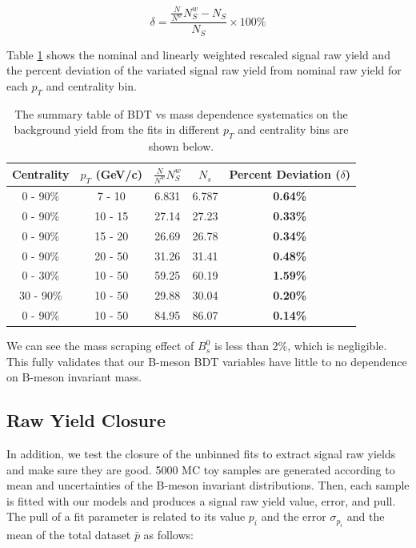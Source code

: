 \begin{equation}
\delta = \frac{\frac{N}{N^{w}} N^{w}_S - N_S}{N_S} \times 100\%
\end{equation}

Table \ref{MassScrapCheck} shows the nominal and linearly weighted rescaled signal raw yield and the percent deviation of the variated signal raw yield from nominal raw yield for each $p_T$ and centrality bin.

\begin{table}[h]
\begin{center}
\caption{The summary table of BDT vs mass dependence systematics on the background yield from the fits in different $p_T$ and centrality bins are shown below.}
\vspace{1em}
\label{MassScrapCheck}
  \begin{tabular}{ |c | c | c| c| c|}
        \hline
     Centrality &  $p_T$ (GeV/c) & $\frac{N}{N^{w}} N^{w}_S$ & $N_{s}$ & Percent Deviation ($\delta$)  \\
    \hline
    \hline
0 - 90\% & 7 - 10 & 6.831  & 6.787 & \textbf{0.64\%} \\ 
0 - 90\% & 10 - 15 &  27.14 & 27.23 & \textbf{0.33\%}  \\ 
0 - 90\% & 15 - 20 & 26.69   & 26.78  &   \textbf{0.34\%}\\ 
0 - 90\% & 20 - 50 &  31.26 &  31.41 &  \textbf{0.48\%}  \\ 
0 - 30\% & 10 - 50 & 59.25  &  60.19  &  \textbf{1.59\%}  \\ 
30 - 90\% & 10 - 50 & 29.88 & 30.04 &  \textbf{0.20\%}    \\ 
0 - 90\% & 10 - 50 & 84.95 & 86.07 &  \textbf{0.14\%}  \\ 
    \hline
\end{tabular}
\end{center}
\end{table}
 

We can see the mass scraping effect of $B^0_s$ is less than 2\%, which is negligible. This fully validates that our B-meson BDT variables have little to no dependence on B-meson invariant mass.

\subsection{Raw Yield Closure}

In addition, we test the closure of the unbinned fits to extract signal raw yields and make sure they are good. 5000 MC toy samples are generated according to mean and uncertainties of the B-meson invariant distributions. Then, each sample is fitted with our models and produces a signal raw yield value, error, and pull. The pull of a fit parameter is related to its value $p_i$ and the error $\sigma_{p_i}$ and the mean of the total dataset $\bar p$ as follows:

